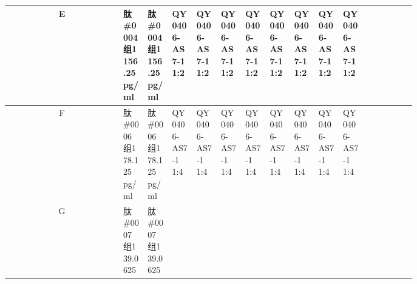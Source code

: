 \documentclass[UTF8,10pt,a4paper,fontset=fandol]{ctexart}
\begin{document}
\begin{center}
\begin{tabular}{c|*{12}{p{0.065\linewidth}|}}
E&
\shortstack{肽\#0004\\组1\\156.25 pg/ml}&
\shortstack{肽\#0004\\组1\\156.25 pg/ml}&
\shortstack{QY0406-\\AS7-1\\1:2}&
\shortstack{QY0406-\\AS7-1\\1:2}&
\shortstack{QY0406-\\AS7-1\\1:2}&
\shortstack{QY0406-\\AS7-1\\1:2}&
\shortstack{QY0406-\\AS7-1\\1:2}&
\shortstack{QY0406-\\AS7-1\\1:2}&
\shortstack{QY0406-\\AS7-1\\1:2}&
\shortstack{QY0406-\\AS7-1\\1:2}& &\\ \hline
F&
\shortstack{肽\#0006\\组1\\78.125 pg/ml}&
\shortstack{肽\#0006\\组1\\78.125 pg/ml}&
\shortstack{QY0406-\\AS7-1\\1:4}&
\shortstack{QY0406-\\AS7-1\\1:4}&
\shortstack{QY0406-\\AS7-1\\1:4}&
\shortstack{QY0406-\\AS7-1\\1:4}&
\shortstack{QY0406-\\AS7-1\\1:4}&
\shortstack{QY0406-\\AS7-1\\1:4}&
\shortstack{QY0406-\\AS7-1\\1:4}&
\shortstack{QY0406-\\AS7-1\\1:4}& &\\ \hline
G&
\shortstack{肽\#0007\\组1\\39.0625}&
\shortstack{肽\#0007\\组1\\39.0625}&

\end{tabular}
\end{center}
\end{document}
